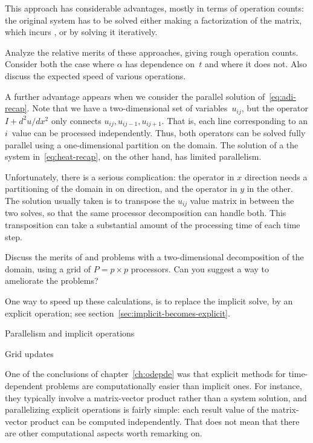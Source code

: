 This approach has considerable advantages, mostly in terms of
operation counts: the original system has to be solved either making a
factorization of the matrix, which incurs , or by
solving it iteratively.

\begin{exercise}
  Analyze the relative merits of these approaches, giving rough
  operation counts. Consider both the case where $\alpha$ has
  dependence on~$t$ and where it does not. Also discuss the expected
  speed of various operations.
\end{exercise}

A further advantage appears when we consider the parallel solution
of~\eqref{eq:adi-recap}. Note that we have a two-dimensional set of
variables~$u_{ij}$, but the operator $I+d^2u/dx^2$ only connects
$u_{ij},u_{ij-1},u_{ij+1}$. That is, each line corresponding to an
$i$~value can be processed independently. Thus, both operators can be
solved fully parallel using a one-dimensional partition on the domain.
The solution of a the system in~\eqref{eq:heat-recap}, on the other
hand, has limited parallelism.

Unfortunately, there is a serious complication: the operator in $x$
direction needs a partitioning of the domain in on direction, and the
operator in $y$ in the other. The solution usually taken is to
transpose the $u_{ij}$ value matrix in between the two solves, so that
the same processor decomposition can handle both. This transposition
can take a substantial amount of the processing time of each time step.

\begin{exercise}
  Discuss the merits of and problems with a two-dimensional
  decomposition of the domain, using a grid of $P=p\times p$
  processors. Can you suggest a way to ameliorate the problems?
\end{exercise}

One way to speed up these calculations, is to replace the implicit
solve, by an explicit operation; see
section~\ref{sec:implicit-becomes-explicit}.

 {Parallelism and implicit operations}
\label{sec:parallel-implicit}


 {Grid updates}

One of the conclusions of chapter~\ref{ch:odepde} was that explicit
methods for time-dependent problems are computationally easier than
implicit ones.  For instance, they typically involve a matrix-vector
product rather than a system solution, and parallelizing explicit
operations is fairly simple: each result value of the matrix-vector
product can be computed independently. That does not mean that there
are other computational aspects worth remarking on.


